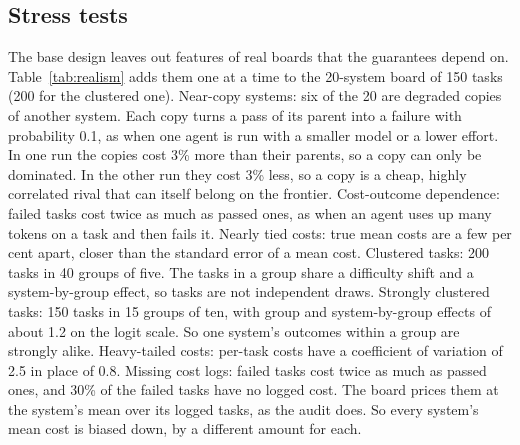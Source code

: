 \documentclass[11pt]{article}
\begin{document}
\subsection{Stress tests}
\label{sec:stress}
The base design leaves out features of real boards that the guarantees depend on. Table~\ref{tab:realism} adds them one at a time to the 20-system board of 150 tasks (200 for the clustered one). Near-copy systems: six of the 20 are degraded copies of another system. Each copy turns a pass of its parent into a failure with probability 0.1, as when one agent is run with a smaller model or a lower effort. In one run the copies cost 3\% more than their parents, so a copy can only be dominated. In the other run they cost 3\% less, so a copy is a cheap, highly correlated rival that can itself belong on the frontier. Cost-outcome dependence: failed tasks cost twice as much as passed ones, as when an agent uses up many tokens on a task and then fails it. Nearly tied costs: true mean costs are a few per cent apart, closer than the standard error of a mean cost. Clustered tasks: 200 tasks in 40 groups of five. The tasks in a group share a difficulty shift and a system-by-group effect, so tasks are not independent draws. Strongly clustered tasks: 150 tasks in 15 groups of ten, with group and system-by-group effects of about 1.2 on the logit scale. So one system's outcomes within a group are strongly alike. Heavy-tailed costs: per-task costs have a coefficient of variation of 2.5 in place of 0.8. Missing cost logs: failed tasks cost twice as much as passed ones, and 30\% of the failed tasks have no logged cost. The board prices them at the system's mean over its logged tasks, as the audit does. So every system's mean cost is biased down, by a different amount for each.
\begin{table}[!tbp]
\centering\small
\resizebox{\textwidth}{!}{}
\caption{Stress tests on known truth, \NumValR{} boards per row, 20 systems. Monte Carlo standard errors are in brackets. Kept, all: the share of boards on which every truly undominated system is kept. Standard set: the set of Section~\ref{sec:set}. Tie-robust set: the set of Proposition~\ref{prop:tierobust}. Best set: the share of boards on which the true best system is in the best set, and on which the cheapest unresolved competitor of the best costs no more than the true best. Clustered and strongly clustered tasks: the first row resamples tasks, and the second row resamples the groups, for the set and for the band.}
\label{tab:realism}
\end{table}
\end{document}
